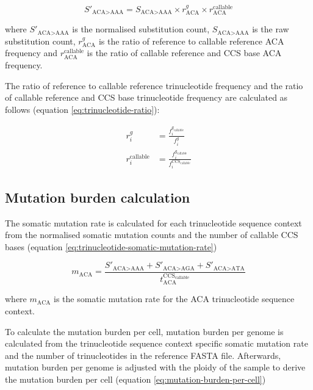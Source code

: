\begin{equation} \label{eq:sbs96-normalisation}
S'_{\text{ACA>AAA}} = S_{\text{ACA>AAA}} \times r^{g}_{\text{ACA}} \times r^{\text{callable}}_{\text{ACA}} 
\end{equation}

where $S'_{\text{ACA>AAA}}$ is the normalised substitution count, $S_{\text{ACA>AAA}}$ is the raw substitution count, $r^{g}_{\text{ACA}}$ is the ratio of reference to callable reference ACA frequency and $r^{\text{callable}}_{\text{ACA}}$ is the ratio of callable reference and CCS base ACA frequency. 

The ratio of reference to callable reference trinucleotide frequency and the ratio of callable reference and CCS base trinucleotide frequency are calculated as follows (equation \ref{eq:trinucleotide-ratio}):

\begin{equation}
\begin{aligned} 
r^{g}_{i} &= \frac{f^{g_{\text{callable}}}_{i}}{f^{g}_{i}} \\[1em]
r^{\text{callable}}_{i} &= \frac{f^{g_{\text{callable}}}_{i}}{f^{\text{CCS}_{\text{callable}}}_{i}}
\end{aligned}
\label{eq:trinucleotide-ratio}
\end{equation}

\subsection{Mutation burden calculation}

The somatic mutation rate is calculated for each trinucleotide sequence context from the normalised somatic mutation counts and the number of callable CCS bases (equation \ref{eq:trinucleotide-somatic-mutation-rate})

\begin{equation} \label{eq:trinucleotide-somatic-mutation-rate}
m_{\text{ACA}} = \frac{S'_{\text{ACA>AAA}} + S'_{\text{ACA>AGA}} + S'_{\text{ACA>ATA}}}{t^{\text{CCS}_{\text{callable}}}_{\text{ACA}}} 
\end{equation}

where $m_{\text{ACA}}$ is the somatic mutation rate for the ACA trinucleotide sequence context. 

To calculate the mutation burden per cell, mutation burden per genome is calculated from the trinucleotide sequence context specific somatic mutation rate and the number of trinucleotides in the reference FASTA file. Afterwards, mutation burden per genome is adjusted with the ploidy of the sample to derive the mutation burden per cell (equation \ref{eq:mutation-burden-per-cell})

